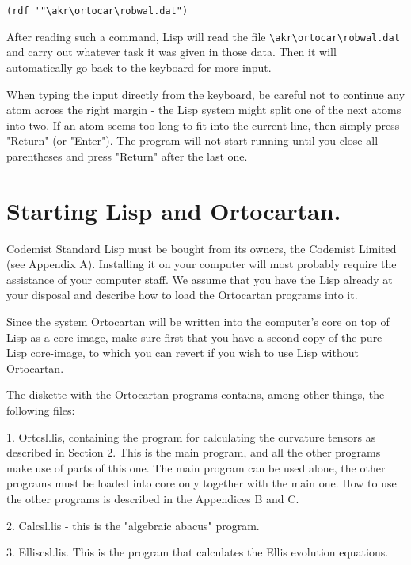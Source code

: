 \bigskip

\begin{verbatim}
(rdf '"\akr\ortocar\robwal.dat")
\end{verbatim}

\bigskip

\noindent After reading such a command, Lisp will read the file
 \verb+\akr\ortocar\robwal.dat+ and carry out whatever task it was given in
those data. Then it will automatically go back to the keyboard for more input.

When  typing  the input directly from the keyboard, be careful not to continue
any atom across the right margin -  the  Lisp  system might split one of the
next atoms into two. If an atom seems  too  long  to fit into the current line,
then simply press "Return" (or "Enter"). The program will not start running
until you close all parentheses and press "Return" after the last one.

\section{Starting Lisp and Ortocartan.}

Codemist Standard Lisp must be bought from its owners, the Codemist Limited
(see Appendix A). Installing it on your computer will most probably require the
assistance of your computer staff. We assume that you have the Lisp already at
your disposal and describe how to load the Ortocartan programs into it.

Since the system Ortocartan will be written into the computer's core on top of
Lisp as a core-image, make sure first that you have a second copy of the pure
Lisp core-image, to which you can revert if you wish to use Lisp without
Ortocartan.

The diskette with the Ortocartan programs contains, among other things, the
following files:

1. Ortcsl.lis, containing the program for calculating the curvature tensors as
described in Section 2. This is the main program, and all the other programs
make use of parts of this one. The main program can be used alone, the other
programs must be loaded into core only together with the main one. How to use
the other programs is described in the Appendices B and C.

2. Calcsl.lis - this is the "algebraic abacus" program.

3. Elliscsl.lis. This is the program that calculates the Ellis evolution
equations.

